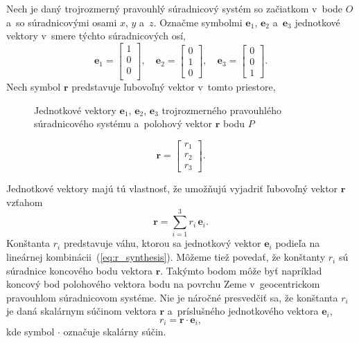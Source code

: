\documentclass[a4paper, 12pt]{book}
\let\vec\mathbf
\begin{document}
Nech je daný trojrozmerný pravouhlý súradnicový systém so začiatkom v~bode $O$ 
a~so súradnicovými osami $x$, $y$ a~$z$.  Označme symbolmi $\vec e_1$, $\vec 
e_2$ a~$\vec e_3$ jednotkové vektory v~smere týchto súradnicových osí,
%
\begin{equation}
\vec e_1 =
\begin{bmatrix}
1\\
0\\
0\\
\end{bmatrix}
{,} \quad
%
\vec e_2 =
\begin{bmatrix}
0\\
1\\
0
\end{bmatrix}
%
{,}\quad
%
\vec e_3 =
\begin{bmatrix}
0\\
0\\
1
\end{bmatrix}
{.}
\end{equation}
%
Nech symbol $\vec r$ predstavuje ľubovoľný vektor v~tomto priestore,

\begin{figure}
\centering

\caption{Jednotkové vektory $\vec e_1$, $\vec e_2$, $\vec e_3$ trojrozmerného 
pravouhlého súradnicového systému a~polohový vektor $\vec r$ bodu $P$}
\label{fig:unit_vectors}
\end{figure}

\begin{equation}
\vec r =
\begin{bmatrix}
r_1\\
r_2\\
r_3
\end{bmatrix}
{.}
\end{equation}

Jednotkové vektory majú tú vlastnosť, že umožňujú vyjadriť ľubovoľný vektor 
$\vec r$ vzťahom
%
\begin{equation}
\label{eq:r_synthesis}
\vec r = \sum_{i = 1}^3 r_i \, \vec e_i{.}
\end{equation}
%
Konštanta $r_i$ predstavuje váhu, ktorou sa jednotkový vektor $\vec e_i$ 
podieľa na lineárnej kombinácii~(\ref{eq:r_synthesis}).  Môžeme tiež povedať, 
že konštanty $r_i$ sú súradnice koncového bodu vektora $\vec r$.  Takýmto bodom 
môže byť napríklad koncový bod polohového vektora bodu na povrchu Zeme 
v~geocentrickom pravouhlom súradnicovom systéme.  Nie je náročné presvedčiť sa, 
že konštanta $r_i$ je daná skalárnym súčinom vektora $\vec r$ a~príslušného 
jednotkového vektora $\vec e_i$,
%
\begin{equation}
\label{eq:r_analysis}
r_i = \vec r \cdot \vec e_i{,}
\end{equation}
%
kde symbol $\cdot$ označuje skalárny súčin.
\end{document}
